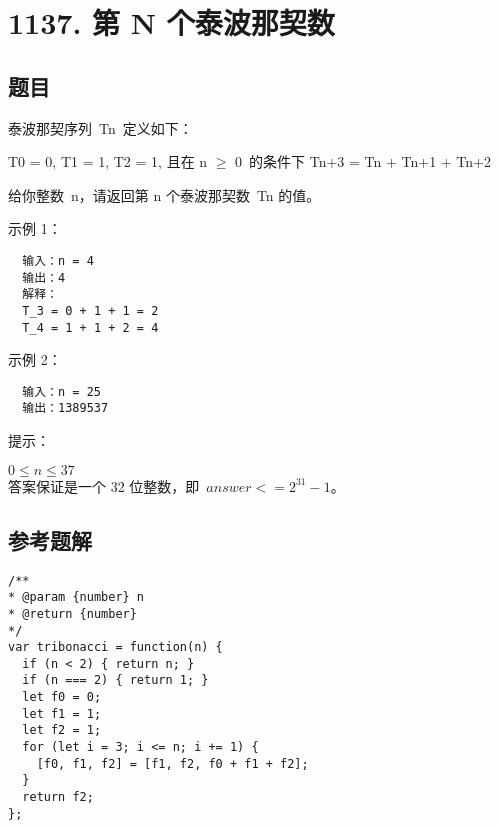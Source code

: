 \newpage
\section{1137. 第 N 个泰波那契数}
\label{leetcode:1137}

\subsection{题目}

泰波那契序列 Tn 定义如下： 

T0 = 0, T1 = 1, T2 = 1, 且在 n $\geq$ 0 的条件下 Tn+3 = Tn + Tn+1 + Tn+2

给你整数 n，请返回第 n 个泰波那契数 Tn 的值。

示例 1：

\begin{verbatim}
  输入：n = 4
  输出：4
  解释：
  T_3 = 0 + 1 + 1 = 2
  T_4 = 1 + 1 + 2 = 4
\end{verbatim}

示例 2：

\begin{verbatim}
  输入：n = 25
  输出：1389537
\end{verbatim}

提示：

$0 \leq n \leq 37$ \\
答案保证是一个 32 位整数，即 $answer <= {2}^{31} - 1$。

\subsection{参考题解}

\begin{verbatim}
/**
* @param {number} n
* @return {number}
*/
var tribonacci = function(n) {
  if (n < 2) { return n; }
  if (n === 2) { return 1; }
  let f0 = 0;
  let f1 = 1;
  let f2 = 1;
  for (let i = 3; i <= n; i += 1) {
    [f0, f1, f2] = [f1, f2, f0 + f1 + f2];
  }
  return f2;
};
\end{verbatim}
